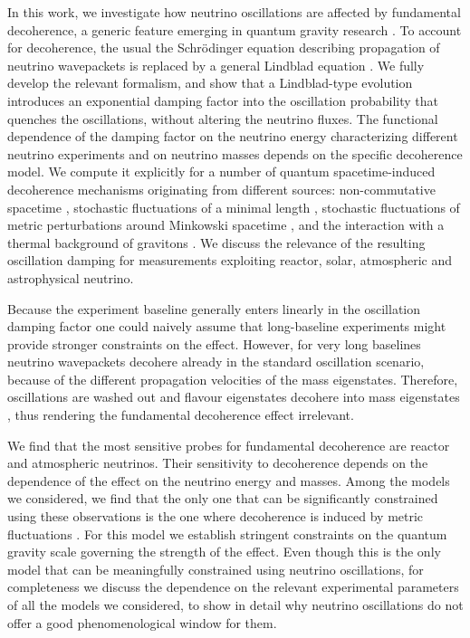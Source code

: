 \documentclass[11pt]{article}
\begin{document}
In this work, we investigate how neutrino oscillations are affected by fundamental decoherence, a generic feature emerging in quantum gravity research \cite{Arzano:2022nlo,Petruzziello:2020wkd,Breuer:2008rh, Diosi1984, Percival:1995an, Gambini:2004de, Bassi:2017szd}. To account for decoherence, the usual the Schr\"{o}dinger equation describing propagation of neutrino wavepackets is replaced by a general Lindblad equation \cite{Lindblad1976}. 
We fully develop the relevant formalism, and show that a Lindblad-type evolution introduces an exponential damping factor into the oscillation probability that quenches the oscillations, without altering the neutrino fluxes. The functional dependence of the damping factor on the neutrino energy characterizing different neutrino experiments and on neutrino masses depends on the specific decoherence model. We compute it explicitly for a number of quantum spacetime-induced decoherence mechanisms originating from different sources: non-commutative spacetime \cite{Arzano:2022nlo}, stochastic fluctuations of a minimal length \cite{Petruzziello:2020wkd}, stochastic fluctuations of metric perturbations around Minkowski spacetime \cite{Breuer:2008rh}, and the interaction with a thermal background of gravitons \cite{Blencowe:2012mp}. We discuss the relevance of the resulting oscillation damping for measurements exploiting reactor, solar, atmospheric and astrophysical neutrino. 

Because the experiment baseline generally enters linearly in the oscillation damping factor one could naively assume that long-baseline experiments might provide stronger constraints on the effect. However, for very long baselines neutrino wavepackets decohere already in the standard oscillation scenario, because of the different propagation velocities of the mass eigenstates. Therefore, oscillations are washed out and flavour eigenstates decohere into mass eigenstates \cite{Farzan:2008eg,Akhmedov:2009rb, Addazi2022, Giunti:1997wq}, thus rendering the fundamental decoherence effect irrelevant. 

We find that the most sensitive probes for fundamental decoherence are reactor and atmospheric neutrinos. Their sensitivity to decoherence depends on the dependence of the effect on the neutrino energy and masses.
Among the models we considered, we find that the only one that can be significantly constrained using these observations is the one where decoherence is induced by metric fluctuations \cite{Breuer:2008rh}. For this model we establish stringent constraints on the quantum gravity scale governing the strength of the effect. Even though this is the only model that can be meaningfully constrained using neutrino oscillations,  for completeness  we discuss the dependence on the relevant experimental parameters of all the  models we considered, to show in detail why neutrino oscillations do not offer a good phenomenological window for them.
\end{document}

